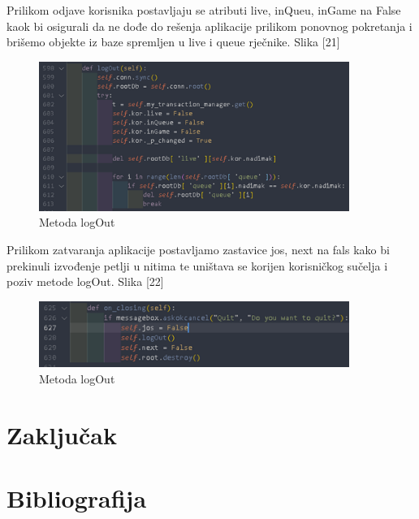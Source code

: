 \documentclass[]{foi} %
\begin{document}
Prilikom odjave korisnika postavljaju se atributi live, inQueu, inGame na False kaok bi osigurali da ne dođe do rešenja aplikacije prilikom ponovnog pokretanja i brišemo objekte iz baze spremljen u live i queue rječnike. Slika [21]
\begin{figure}[]
    \centering
    \includegraphics[width=0.9\textwidth]{slike/impl_12.png}
    \caption{Metoda logOut \cite{Vlastita izrada}}
    \label{fig:podjela}
\end{figure}

Prilikom zatvaranja aplikacije postavljamo zastavice jos, next na fals kako bi prekinuli izvođenje petlji u nitima te uništava se korijen korisničkog sučelja i poziv metode logOut. Slika [22]

\begin{figure}[]
    \centering
    \includegraphics[width=0.9\textwidth]{slike/impl_13.png}
    \caption{Metoda logOut \cite{Vlastita izrada}}
    \label{fig:podjela}
\end{figure}



\chapter{Zaključak}

\chapter{Bibliografija}
\end{document}
